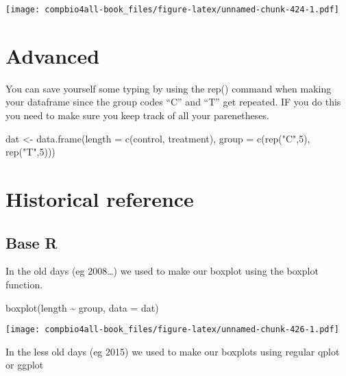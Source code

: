\documentclass[
]{book}
\newenvironment{Shaded}{\begin{snugshade}}{\end{snugshade}}
\newcommand{\AttributeTok}[1]{\textcolor[rgb]{0.77,0.63,0.00}{#1}}
\newcommand{\DecValTok}[1]{\textcolor[rgb]{0.00,0.00,0.81}{#1}}
\newcommand{\FunctionTok}[1]{\textcolor[rgb]{0.00,0.00,0.00}{#1}}
\newcommand{\NormalTok}[1]{#1}
\newcommand{\OtherTok}[1]{\textcolor[rgb]{0.56,0.35,0.01}{#1}}
\newcommand{\SpecialCharTok}[1]{\textcolor[rgb]{0.00,0.00,0.00}{#1}}
\newcommand{\StringTok}[1]{\textcolor[rgb]{0.31,0.60,0.02}{#1}}
\begin{document}
\texttt{[image: compbio4all-book\_files/figure-latex/unnamed-chunk-424-1.pdf]}

\hypertarget{advanced-2}{%
\section{Advanced}\label{advanced-2}}

You can save yourself some typing by using the rep() command when making your dataframe since the group codes ``C'' and ``T'' get repeated. IF you do this you need to make sure you keep track of all your parenetheses.

\begin{Shaded}
\begin{Highlighting}[]
\NormalTok{dat }\OtherTok{\textless{}{-}} \FunctionTok{data.frame}\NormalTok{(}\AttributeTok{length =} \FunctionTok{c}\NormalTok{(control, }
\NormalTok{                             treatment),}
                  \AttributeTok{group =} \FunctionTok{c}\NormalTok{(}\FunctionTok{rep}\NormalTok{(}\StringTok{"C"}\NormalTok{,}\DecValTok{5}\NormalTok{),}
                            \FunctionTok{rep}\NormalTok{(}\StringTok{"T"}\NormalTok{,}\DecValTok{5}\NormalTok{)))}
\end{Highlighting}
\end{Shaded}

\hypertarget{historical-reference-1}{%
\section{Historical reference}\label{historical-reference-1}}

\hypertarget{base-r-1}{%
\subsection{Base R}\label{base-r-1}}

In the old days (eg 2008\ldots) we used to make our boxplot using the boxplot function.

\begin{Shaded}
\begin{Highlighting}[]
\FunctionTok{boxplot}\NormalTok{(length }\SpecialCharTok{\textasciitilde{}}\NormalTok{ group, }\AttributeTok{data =}\NormalTok{ dat)}
\end{Highlighting}
\end{Shaded}

\texttt{[image: compbio4all-book\_files/figure-latex/unnamed-chunk-426-1.pdf]}

In the less old days (eg 2015) we used to make our boxplots using regular qplot or ggplot
\end{document}
